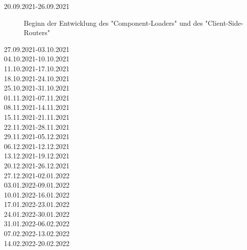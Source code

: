 
\begin{description}
    \item[20.09.2021-26.09.2021]Beginn der Entwicklung des "Component-Loaders" und des "Client-Side-Routers"
    \item[27.09.2021-03.10.2021]
    \item[04.10.2021-10.10.2021]
    \item[11.10.2021-17.10.2021]
    \item[18.10.2021-24.10.2021]
    \item[25.10.2021-31.10.2021]
    \item[01.11.2021-07.11.2021]
    \item[08.11.2021-14.11.2021]
    \item[15.11.2021-21.11.2021]
    \item[22.11.2021-28.11.2021]
    \item[29.11.2021-05.12.2021]
    \item[06.12.2021-12.12.2021]
    \item[13.12.2021-19.12.2021]
    \item[20.12.2021-26.12.2021]
    \item[27.12.2021-02.01.2022]
    \item[03.01.2022-09.01.2022]
    \item[10.01.2022-16.01.2022]
    \item[17.01.2022-23.01.2022]
    \item[24.01.2022-30.01.2022]
    \item[31.01.2022-06.02.2022]
    \item[07.02.2022-13.02.2022]
    \item[14.02.2022-20.02.2022] 
\end{description}